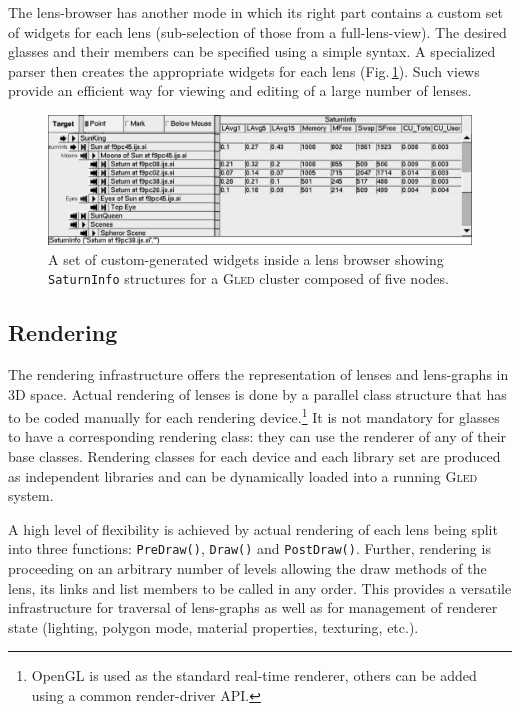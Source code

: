 \documentclass[a4paper,11pt]{article}
\def\gled{\textsc{Gled}\xspace}
\def\smalltt#1{{\small\texttt{#1}}}
\def\foottt#1{{\footnotesize\texttt{#1}}}
\begin{document}
The lens-browser has another mode in which its right part contains a
custom set of widgets for each lens (sub-selection of those from a
full-lens-view).  The desired glasses and their members can be
specified using a simple syntax.  A specialized parser then creates
the appropriate widgets for each lens (Fig.\,\ref{fig:custom_view}).
Such views provide an efficient way for viewing and editing of a large
number of lenses.

\begin{figure}
  \centering
  \includegraphics[width=\textwidth]{figs/custom_view}
  \caption{A set of custom-generated widgets inside a lens browser
    showing \foottt{SaturnInfo} structures for a \gled cluster
    composed of five nodes.}
  \label{fig:custom_view}
\end{figure}


\subsection{Rendering}

The rendering infrastructure offers the representation of lenses and
lens-graphs in 3D space. Actual rendering of lenses is done by a
parallel class structure that has to be coded manually for each
rendering device.\footnote{OpenGL is used as the standard real-time
  renderer, others can be added using a common render-driver API.}
It is not mandatory for glasses to have a corresponding rendering
class: they can use the renderer of any of their base classes.
Rendering classes for each device and each library set are produced as
independent libraries and can be dynamically loaded into a running
\gled system.

A high level of flexibility is achieved by actual rendering of each
lens being split into three functions: \smalltt{PreDraw()},
\smalltt{Draw()} and \smalltt{PostDraw()}. Further, rendering is
proceeding on an arbitrary number of levels allowing the draw methods
of the lens, its links and list members to be called in any order.
This provides a versatile infrastructure for traversal of lens-graphs
as well as for management of renderer state (lighting, polygon mode,
material properties, texturing, etc.).
\end{document}
